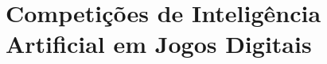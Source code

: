 \chapter{\label{chap:game-ai-competitions}Competições de Inteligência Artificial
em Jogos Digitais}
